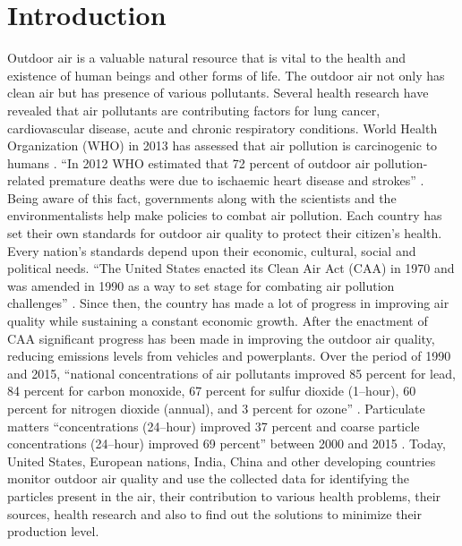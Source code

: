\documentclass[sigconf]{acmart}
\begin{document}
\section{Introduction}
   Outdoor air is a valuable natural resource that is vital to the health and existence of human beings and other forms of life. The outdoor air not only has clean air but has presence of various pollutants. Several health research have revealed that air pollutants are contributing factors for lung cancer, cardiovascular disease, acute and chronic respiratory conditions. World Health Organization (WHO) in 2013 has assessed that air pollution is carcinogenic to humans \cite{www-who}. ``In 2012 WHO estimated that 72 percent of outdoor air pollution-related premature deaths were due to ischaemic heart disease and strokes'' \cite{www-who}.
   Being aware of this fact, governments along with the scientists and the environmentalists help make policies to combat air pollution. Each country has set their own standards for outdoor air quality to protect their citizen's health. Every nation's standards depend upon their economic, cultural, social and political needs. ``The United States enacted its Clean Air Act (CAA) in 1970 and was amended in 1990 as a way to set stage for combating air pollution challenges'' \cite{epa-gov}. Since then, the country has made a lot of progress in improving air quality while sustaining a constant economic growth. After the enactment of CAA significant progress has been made in improving the outdoor air quality, reducing emissions levels from vehicles and powerplants. Over the period of 1990 and 2015, ``national concentrations of air pollutants improved 85 percent for lead, 84 percent for carbon monoxide, 67 percent for sulfur dioxide (1--hour), 60 percent for nitrogen dioxide (annual), and 3 percent for ozone'' \cite{epa-gov}. Particulate matters ``concentrations (24--hour) improved 37 percent and coarse particle concentrations (24--hour) improved 69 percent'' between 2000 and 2015 \cite{epa-gov}.
   Today, United States, European nations, India, China and other developing countries monitor outdoor air quality and use the collected data for identifying the particles present in the air, their contribution to various health problems, their sources, health research and also to find out the solutions to minimize their production level.
\end{document}
